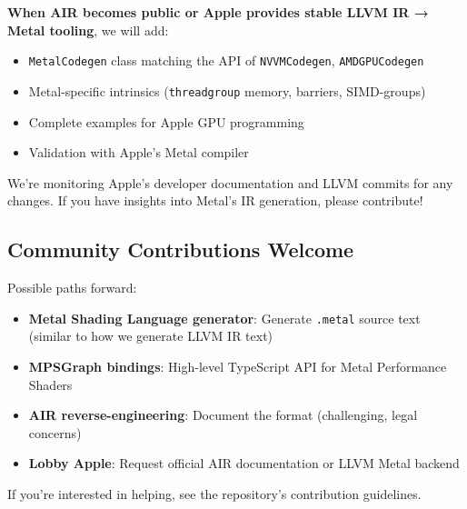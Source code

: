 \documentclass[11pt]{article}
\begin{document}
\textbf{When AIR becomes public or Apple provides stable LLVM IR → Metal tooling}, we will add:

\begin{itemize}[noitemsep]
  \item \texttt{MetalCodegen} class matching the API of \texttt{NVVMCodegen}, \texttt{AMDGPUCodegen}
  \item Metal-specific intrinsics (\texttt{threadgroup} memory, barriers, SIMD-groups)
  \item Complete examples for Apple GPU programming
  \item Validation with Apple's Metal compiler
\end{itemize}

We're monitoring Apple's developer documentation and LLVM commits for any changes. If you have insights into Metal's IR generation, please contribute!

\subsection{Community Contributions Welcome}

Possible paths forward:
\begin{itemize}[noitemsep]
  \item \textbf{Metal Shading Language generator}: Generate \texttt{.metal} source text (similar to how we generate LLVM IR text)
  \item \textbf{MPSGraph bindings}: High-level TypeScript API for Metal Performance Shaders
  \item \textbf{AIR reverse-engineering}: Document the format (challenging, legal concerns)
  \item \textbf{Lobby Apple}: Request official AIR documentation or LLVM Metal backend
\end{itemize}

If you're interested in helping, see the repository's contribution guidelines.
\end{document}
